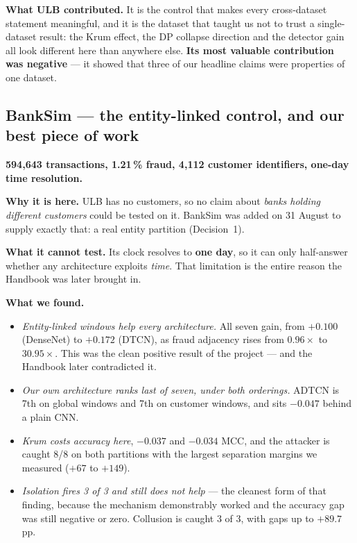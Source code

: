 \documentclass[11pt]{article}
\begin{document}
\textbf{What ULB contributed.} It is the control that makes every cross-dataset statement meaningful, and
it is the dataset that taught us not to trust a single-dataset result: the Krum effect, the DP collapse
direction and the detector gain all look different here than anywhere else. \textbf{Its most valuable
contribution was negative} --- it showed that three of our headline claims were properties of one dataset.

\subsection{BankSim --- the entity-linked control, and our best piece of work}

\textbf{594{,}643 transactions, 1.21\,\% fraud, 4{,}112 customer identifiers, one-day time resolution.}

\textbf{Why it is here.} ULB has no customers, so no claim about \emph{banks holding different customers}
could be tested on it. BankSim was added on 31 August to supply exactly that: a real entity partition
(Decision~1).

\textbf{What it cannot test.} Its clock resolves to \textbf{one day}, so it can only half-answer whether
any architecture exploits \emph{time}. That limitation is the entire reason the Handbook was later brought
in.

\textbf{What we found.}
\begin{itemize}\itemsep2pt
  \item \emph{Entity-linked windows help every architecture.} All seven gain, from $+0.100$ (DenseNet) to
        $+0.172$ (DTCN), as fraud adjacency rises from $0.96\times$ to $30.95\times$. This was the clean
        positive result of the project --- and the Handbook later contradicted it.
  \item \emph{Our own architecture ranks last of seven, under both orderings.} ADTCN is 7th on global
        windows and 7th on customer windows, and sits $-0.047$ behind a plain CNN.
  \item \emph{Krum costs accuracy here}, $-0.037$ and $-0.034$ MCC, and the attacker is caught 8/8 on both
        partitions with the largest separation margins we measured ($+67$ to $+149$).
  \item \emph{Isolation fires 3 of 3 and still does not help} --- the cleanest form of that finding,
        because the mechanism demonstrably worked and the accuracy gap was still negative or zero.
        Collusion is caught 3 of 3, with gaps up to $+89.7$\,pp.
\end{itemize}
\end{document}

